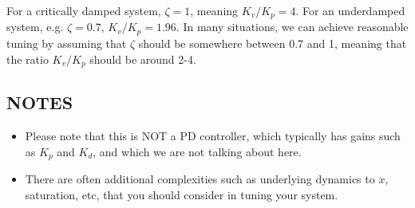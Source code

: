 \documentclass{article}
\begin{document}
    For a critically damped system, $\zeta=1$, meaning $K_v/K_p = 4$. For an underdamped system, e.g. $\zeta=0.7$, $K_v/K_p = 1.96$. In many situations, we can achieve reasonable tuning by assuming that $\zeta$ should be somewhere between 0.7 and 1, meaning that the ratio $K_v/K_p$ should be around 2-4.
    \subsection*{NOTES}
    \begin{itemize}
        \item Please note that this is NOT a PD controller, which typically has gains such as $K_p$ and $K_d$, and which we are not talking about here.
        \item There are often additional complexities such as underlying dynamics to $\ddot{x}$, saturation, etc, that you should consider in tuning your system.
    \end{itemize}
\end{document}
